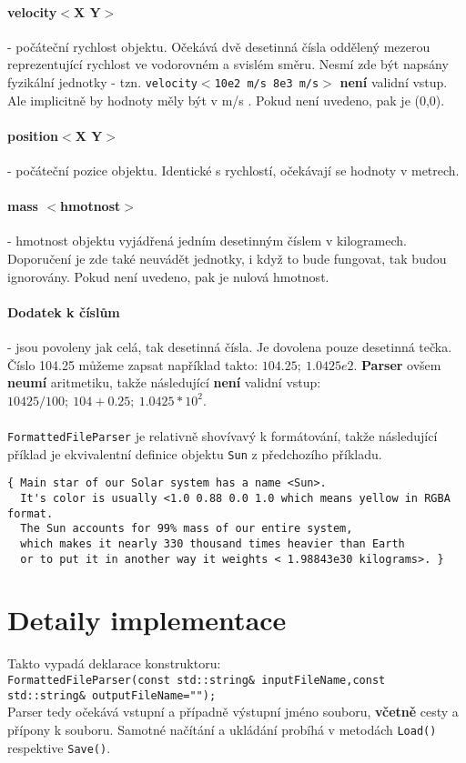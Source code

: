 \paragraph{velocity$ < $X Y$ > $} - počáteční rychlost objektu. Očekává dvě desetinná čísla oddělený mezerou reprezentující rychlost ve vodorovném a svislém směru. Nesmí zde být napsány fyzikální jednotky - tzn. \texttt{velocity$ < $10e2 m/s 8e3 m/s$ > $} \textbf{není} validní vstup. Ale implicitně by hodnoty měly být v m/s . Pokud není uvedeno, pak je (0,0).
\paragraph{position$ < $X Y$ > $} - počáteční pozice objektu. Identické s rychlostí, očekávají se hodnoty v metrech.
\paragraph{mass $ < $hmotnost$ > $ } - hmotnost objektu vyjádřená jedním desetinným číslem v kilogramech. Doporučení je zde také neuvádět jednotky, i když to bude fungovat, tak budou ignorovány. Pokud není uvedeno, pak je nulová hmotnost.
\paragraph{Dodatek k číslům} - jsou povoleny jak celá, tak desetinná čísla. Je dovolena pouze desetinná tečka. Číslo 104.25 můžeme zapsat například takto: $ 104.25 ;\ 1.0425e2$.
\textbf{Parser} ovšem \textbf{neumí} aritmetiku, takže následující \textbf{není} validní vstup: $ 10425/100 ;\ 104 + 0.25 ;\ 1.0425 * 10^2 $.
\paragraph{}
\texttt{FormattedFileParser} je relativně shovívavý k formátování, takže následující příklad je ekvivalentní definice objektu \texttt{Sun} z předchozího příkladu.
\begin{lstlisting}
{ Main star of our Solar system has a name <Sun>. 
  It's color is usually <1.0 0.88 0.0 1.0 which means yellow in RGBA format.
  The Sun accounts for 99% mass of our entire system,
  which makes it nearly 330 thousand times heavier than Earth
  or to put it in another way it weights < 1.98843e30 kilograms>. }
\end{lstlisting}

\section{Detaily implementace}
Takto vypadá deklarace konstruktoru: \\
\lstinline|FormattedFileParser(const std::string& inputFileName,const std::string& outputFileName="");|\\
Parser tedy očekává vstupní a případně výstupní jméno souboru,\textbf{ včetně} cesty a přípony k souboru. Samotné načítání a ukládání probíhá v metodách \texttt{Load()} respektive \texttt{Save()}.

